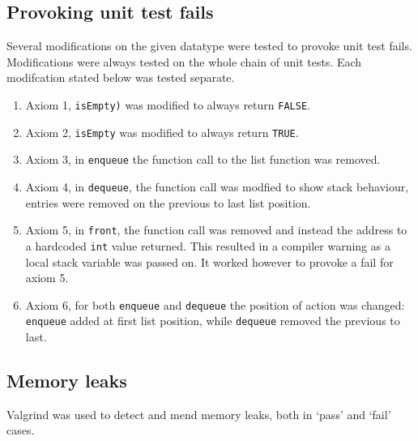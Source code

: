 \documentclass[a4paper,11pt,twoside]{article}
\begin{document}
\subsection{Provoking unit test fails}
Several modifications on the given datatype were tested to provoke
unit test fails. Modifications were always tested on the whole chain
of unit tests. Each modifcation stated below was tested separate. 

\begin{enumerate}
\item Axiom 1, \texttt{isEmpty)} was modified to always 
return \texttt{FALSE}.
\item Axiom 2, \texttt{isEmpty} was modified to always
    return \texttt{TRUE}.
\item Axiom 3, in \texttt{enqueue} the function call
  to the list function was removed.
\item Axiom 4, in \texttt{dequeue}, the function call
  was modfied to show stack behaviour, entries were removed on the
  previous to last list position.
\item Axiom 5, in \texttt{front}, the function call
  was removed and instead the address to a hardcoded \texttt{int} value
  returned. This resulted in a compiler warning as a local stack
  variable was passed on. It worked however to provoke a fail for axiom
  5.
\item Axiom 6, for both \texttt{enqueue} and \texttt{dequeue} the
  position of action was changed: \texttt{enqueue} added at first list
  position, while \texttt{dequeue} removed the previous to last.
\end{enumerate} 

\subsection{Memory leaks}
Valgrind was used to detect and mend memory leaks, both in `pass' and `fail' cases.


\end{document}
